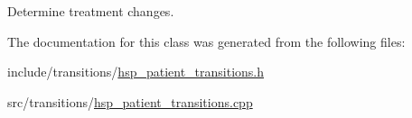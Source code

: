 Determine treatment changes. 



The documentation for this class was generated from the following files\+:\begin{DoxyCompactItemize}
\item 
include/transitions/\hyperlink{hsp__patient__transitions_8h}{hsp\+\_\+patient\+\_\+transitions.\+h}\item 
src/transitions/\hyperlink{hsp__patient__transitions_8cpp}{hsp\+\_\+patient\+\_\+transitions.\+cpp}\end{DoxyCompactItemize}
